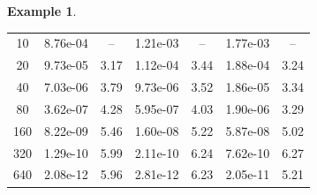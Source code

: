 \documentclass[times,final,11pt]{elsarticle}
\numberwithin{equation}{section}
\theoremstyle{definition}
\newtheorem{exa}[remark]{Example}
\theoremstyle{remark}
\begin{document}
\begin{exa}
\begin{table}[th!]
\begin{center}
\begin{tabular}{clclclc}
				\midrule[1.5pt]
				
				10  & 8.76e-04 & --   & 1.21e-03 & --   & 1.77e-03 & --  \\ 
				20  & 9.73e-05 & 3.17 & 1.12e-04 & 3.44 & 1.88e-04 & 3.24\\ 
				40  & 7.03e-06 & 3.79 & 9.73e-06 & 3.52 & 1.86e-05 & 3.34\\ 
				80  & 3.62e-07 & 4.28 & 5.95e-07 & 4.03 & 1.90e-06 & 3.29\\ 
				160 & 8.22e-09 & 5.46 & 1.60e-08 & 5.22 & 5.87e-08 & 5.02\\ 
				320 & 1.29e-10 & 5.99 & 2.11e-10 & 6.24 & 7.62e-10 & 6.27\\ 
				640 & 2.08e-12 & 5.96 & 2.81e-12 & 6.23 & 2.05e-11 & 5.21\\ 
				
				\bottomrule[1.5pt]
				
			\end{tabular}
		\end{center}
		\label{ErrorTable}
	\end{table}
	
\end{exa}
\end{document}
